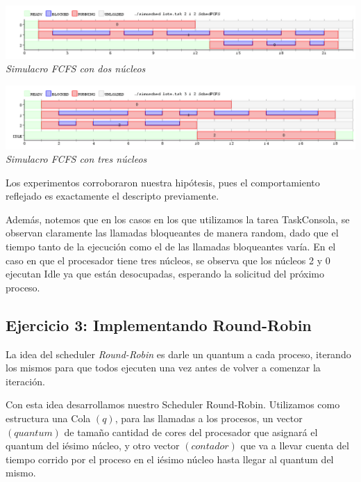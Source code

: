 \vspace{\baselineskip}
\begin{center}
\includegraphics[scale=0.45]{../tp1/Test/resEj2Co2.png}
\\
\vspace{1pt}
\footnotesize\textit{Simulacro FCFS con dos n\'ucleos}
\end{center}
\vspace{\baselineskip}

\vspace{\baselineskip}
\begin{center}
\includegraphics[scale=0.45]{../tp1/Test/resEj2Co3.png}
\\
\vspace{1pt}
\footnotesize\textit{Simulacro FCFS con tres n\'ucleos}
\end{center}
\vspace{\baselineskip}


Los experimentos corroboraron nuestra hip\'otesis, pues el comportamiento reflejado es exactamente el descripto previamente.

Adem\'as, notemos que en los casos en los que utilizamos la tarea TaskConsola, se observan claramente
las llamadas bloqueantes de manera random, dado que el tiempo tanto de la ejecuci\'on como el de las llamadas bloqueantes var\'ia.
En el caso en que el procesador tiene tres n\'ucleos, se observa que los n\'ucleos 2 y 0 ejecutan 
Idle ya que est\'an desocupadas, esperando la solicitud del pr\'oximo proceso.

\subsection{Ejercicio 3: Implementando Round-Robin}
La idea del scheduler \textit{Round-Robin} es darle un quantum a cada proceso, iterando los mismos para que todos ejecuten una vez antes de volver a comenzar la iteraci\'on.


Con esta idea desarrollamos nuestro Scheduler Round-Robin. Utilizamos como estructura una Cola $(q)$, para las llamadas a los procesos, 
un vector $(quantum)$ de tama\~no cantidad de cores del procesador que asignar\'a el quantum del i\'esimo n\'ucleo, 
y otro vector $(contador)$ que va a llevar cuenta del tiempo corrido por el proceso en el i\'esimo n\'ucleo hasta llegar al quantum del mismo.

